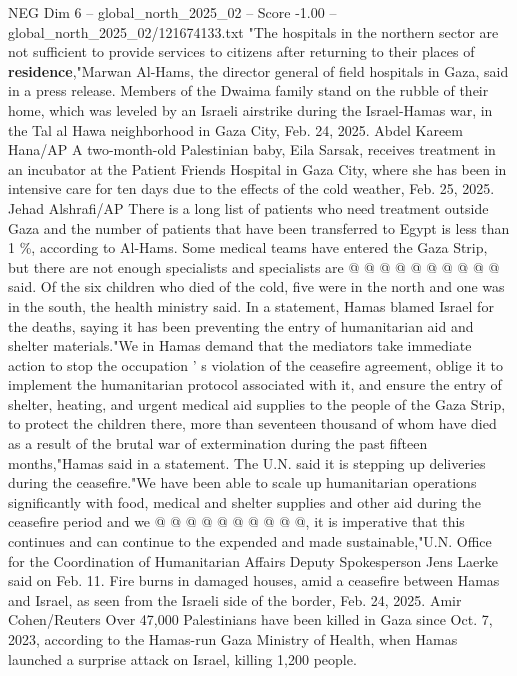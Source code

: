 \begin{textsample}{NEG Dim 6 – global\_north\_2025\_02 – Score -1.00 – global\_north\_2025\_02/121674133.txt}  \label{ex:f6_neg_116}
"The hospitals in the northern sector are not sufficient to provide services to citizens after returning to their places of \textbf{residence},"Marwan Al-Hams, the director general of field hospitals in Gaza, said in a press release.
Members of the Dwaima family stand on the rubble of their home, which was leveled by an Israeli airstrike during the Israel-Hamas war, in the Tal al Hawa neighborhood in Gaza City, Feb. 24, 2025.
Abdel Kareem Hana/AP A two-month-old Palestinian baby, Eila Sarsak, receives treatment in an incubator at the Patient Friends Hospital in Gaza City, where she has been in intensive care for ten days due to the effects of the cold weather, Feb. 25, 2025.
Jehad Alshrafi/AP There is a long list of patients who need treatment outside Gaza and the number of patients that have been transferred to Egypt is less than 1 \%, according to Al-Hams.
Some medical teams have entered the Gaza Strip, but there are not enough specialists and specialists are @ @ @ @ @ @ @ @ @ @ said.
Of the six children who died of the cold, five were in the north and one was in the south, the health ministry said.
In a statement, Hamas blamed Israel for the deaths, saying it has been preventing the entry of humanitarian aid and shelter materials."We in Hamas demand that the mediators take immediate action to stop the occupation ' s violation of the ceasefire agreement, oblige it to implement the humanitarian protocol associated with it, and ensure the entry of shelter, heating, and urgent medical aid supplies to the people of the Gaza Strip, to protect the children there, more than seventeen thousand of whom have died as a result of the brutal war of extermination during the past fifteen months,"Hamas said in a statement.
The U.N. said it is stepping up deliveries during the ceasefire."We have been able to scale up humanitarian operations significantly with food, medical and shelter supplies and other aid during the ceasefire period and we @ @ @ @ @ @ @ @ @ @, it is imperative that this continues and can continue to the expended and made sustainable,"U.N.
Office for the Coordination of Humanitarian Affairs Deputy Spokesperson Jens Laerke said on Feb. 11.
Fire burns in damaged houses, amid a ceasefire between Hamas and Israel, as seen from the Israeli side of the border, Feb. 24, 2025.
Amir Cohen/Reuters Over 47,000 Palestinians have been killed in Gaza since Oct. 7, 2023, according to the Hamas-run Gaza Ministry of Health, when Hamas launched a surprise attack on Israel, killing 1,200 people.

\end{textsample}
